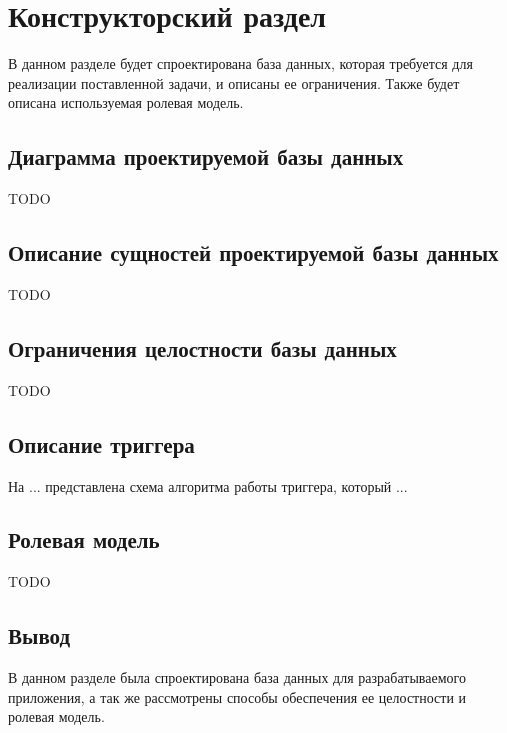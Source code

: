 \chapter{Конструкторский раздел}

В данном разделе будет спроектирована база данных, которая требуется для реализации поставленной задачи, и описаны ее ограничения. Также будет описана используемая ролевая модель.

\section{Диаграмма проектируемой базы данных}

TODO

\section{Описание сущностей проектируемой базы данных}

TODO

\section{Ограничения целостности базы данных}

TODO

\section{Описание триггера}

На ... представлена схема алгоритма работы триггера, который ...

\section{Ролевая модель}

TODO

\section*{Вывод}

В данном разделе была спроектирована база данных для разрабатываемого приложения, а так же рассмотрены способы обеспечения ее целостности и ролевая модель.